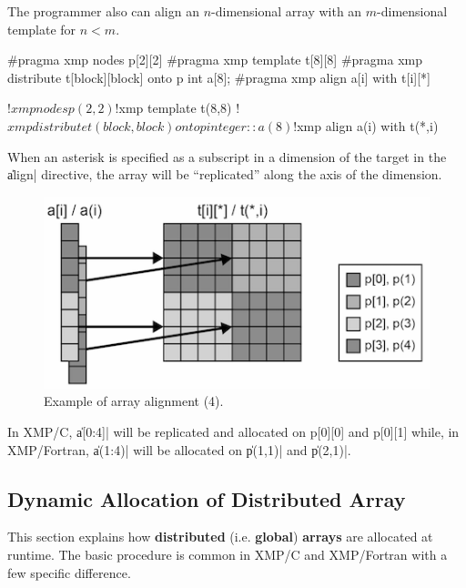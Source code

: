 The programmer also can align an $n$-dimensional array with an
$m$-dimensional template for $n < m$.

\begin{XCexample}
#pragma xmp nodes p[2][2]
#pragma xmp template t[8][8]
#pragma xmp distribute t[block][block] onto p
int a[8];
#pragma xmp align a[i] with t[i][*]
\end{XCexample}

\begin{XFexample}
!$xmp nodes p(2,2)
!$xmp template t(8,8)
!$xmp distribute t(block,block) onto p
integer :: a(8)
!$xmp align a(i) with t(*,i)
\end{XFexample}

When an asterisk is specified as a subscript in a dimension of the
target {\template} in the \|align| directive, the array will be
``replicated'' along the axis of the dimension.

\begin{figure}
  \centering
  \includegraphics[width=0.9\columnwidth]{figs/replicate.png}
  \caption{Example of array alignment (4).}
\end{figure}

In XMP/C, \|a[0:4]| will be replicated and allocated on p[0][0] and
p[0][1] while, in XMP/Fortran, \|a(1:4)| will be allocated on \|p(1,1)|
and \|p(2,1)|.


\subsection{Dynamic Allocation of Distributed Array}

This section explains how {\bf distributed} (i.e. {\bf global}) {\bf
arrays} are allocated 
at runtime. The basic procedure is common in XMP/C and XMP/Fortran with
a few specific difference.


